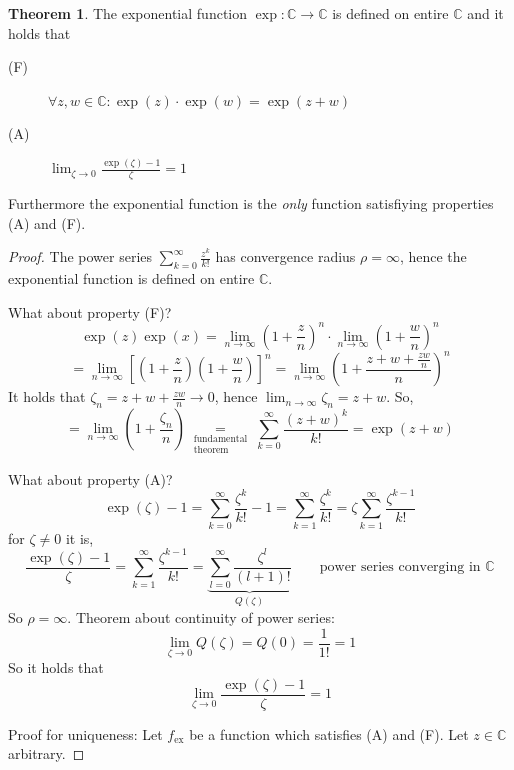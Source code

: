 \documentclass[a4paper,landscape,twocolumn]{article}
\theoremstyle{definition}
\newtheorem{theorem}{Theorem}
\begin{document}
\begin{theorem}
  The exponential function $\operatorname{exp}: \mathbb C \to \mathbb C$
  is defined on entire $\mathbb C$ and it holds that
  \begin{description}
    \item[(F)] $\forall z, w \in \mathbb C: \operatorname{exp}(z) \cdot \operatorname{exp}(w) = \operatorname{exp}(z + w)$
    \item[(A)] $\lim_{\zeta\to0} \frac{\operatorname{exp}(\zeta) - 1}{\zeta} = 1$
  \end{description}
  Furthermore the exponential function is the \emph{only} function satisfiying
  properties (A) and (F).
\end{theorem}
\begin{proof}
  The power series $\sum_{k=0}^\infty \frac{z^k}{k!}$ has convergence radius $\rho = \infty$,
  hence the exponential function is defined on entire $\mathbb C$.

  What about property (F)?
  \[
    \operatorname{exp}(z) \operatorname{exp}(x)
    = \lim_{n\to\infty} \left(1 + \frac zn\right)^n \cdot \lim_{n\to\infty} \left(1 + \frac wn\right)^n
  \] \[
    = \lim_{n\to\infty} \left[\left(1 + \frac zn\right) \left(1 + \frac wn\right)\right]^n
    = \lim_{n\to\infty} \left(1 + \frac{z + w + \frac {zw}{n}}{n}\right)^n
  \]
  It holds that $\zeta_n = z + w + \frac{zw}{n} \to 0$, hence $\lim_{n\to\infty} \zeta_n = z + w$.
  So,
  \[
    = \lim_{n\to\infty} \left(1 + \frac{\zeta_n}{n}\right)
    \underset{\substack{\text{fundamental} \\ \text{theorem}}}{=} \sum_{k=0}^\infty
    \frac{(z + w)^k}{k!} = \exp(z + w)
  \]

  What about property (A)?
  \[
    \exp(\zeta) - 1
    = \sum_{k=0}^\infty \frac{\zeta^k}{k!} - 1
    = \sum_{k=1}^\infty \frac{\zeta^k}{k!}
    = \zeta \sum_{k=1}^\infty \frac{\zeta^{k-1}}{k!}
  \]
  for $\zeta \neq 0$ it is,
  \[
    \frac{\exp(\zeta) - 1}{\zeta}
    = \sum_{k=1}^\infty \frac{\zeta^{k-1}}{k!}
    = \underbrace{\sum_{l=0}^\infty \frac{\zeta^l}{(l+1)!}}_{Q(\zeta)}
    \qquad \text{power series converging in $\mathbb C$}
  \]
  So $\rho = \infty$. Theorem about continuity of power series:
  \[ \lim_{\zeta \to 0} Q(\zeta) = Q(0) = \frac1{1!} = 1 \]
  So it holds that
  \[ \lim_{\zeta \to 0} \frac{\exp(\zeta) - 1}{\zeta} = 1 \]

  Proof for uniqueness:
  Let $f_{\text{ex}}$ be a function which satisfies (A) and (F).
  Let $z \in \mathbb C$ arbitrary.


\end{proof}
\end{document}
